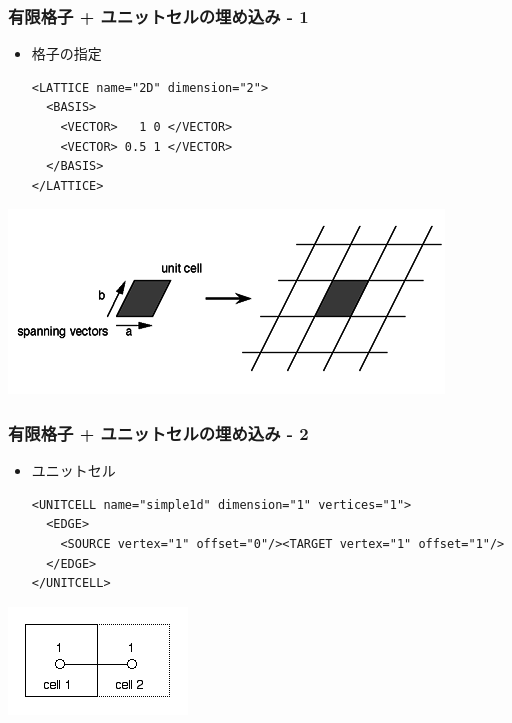 \begin{frame}[t,fragile]
  \frametitle{有限格子 + ユニットセルの埋め込み - 1}
  \begin{itemize}
  \item 格子の指定
  \begin{lstlisting}
<LATTICE name="2D" dimension="2">
  <BASIS>
    <VECTOR>   1 0 </VECTOR>
    <VECTOR> 0.5 1 </VECTOR>
  </BASIS>
</LATTICE>
\end{lstlisting}
  \end{itemize}
  \begin{center}
    \includegraphics[height=0.3\textheight]{TutorialLatticeHOWTOLattice1}
  \end{center}
\end{frame}

\begin{frame}[t, fragile]
  \frametitle{有限格子 + ユニットセルの埋め込み - 2}
  \begin{itemize}
  \item ユニットセル
  \begin{lstlisting}
<UNITCELL name="simple1d" dimension="1" vertices="1">
  <EDGE>
    <SOURCE vertex="1" offset="0"/><TARGET vertex="1" offset="1"/>
  </EDGE>
</UNITCELL>
\end{lstlisting}
  \end{itemize}
  \begin{center}
    \includegraphics[height=0.25\textheight]{TutorialLatticeHOWTOLatticegraph3}
  \end{center}
\end{frame}

